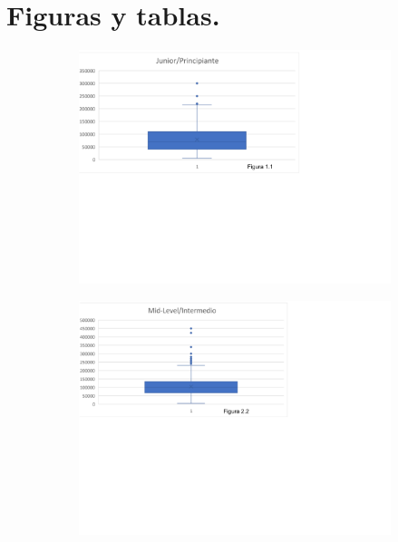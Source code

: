 \documentclass{article}
\begin{document}
	\section{Figuras y tablas.}		
	\begin{figure}[htbp]
		\centering
		\begin{subfigure}[b]{1.1\textwidth}
			\includegraphics[width=\textwidth]{FigurasTablas/figura1.1diagrama}
			\label{figura 1.1 diagrama}
		\end{subfigure}

		\begin{subfigure}[b]{1.1\textwidth}
			\includegraphics[width=\textwidth]{FigurasTablas/figura2.2diagrama.png}
			\label{figura 2.2 diagrama}
		\end{subfigure}
		
	\end{figure}
\end{document}
